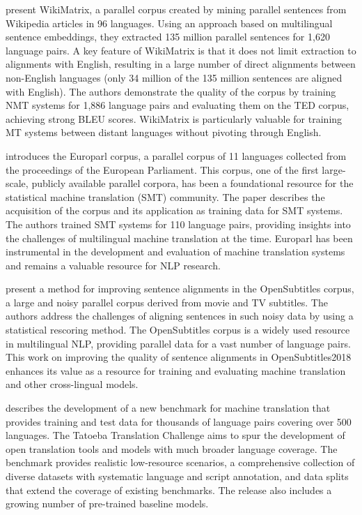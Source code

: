 \documentclass[acmsmall]{acmart}
\begin{document}
   \citep{schwenk-etal-2021-wikimatrix} present WikiMatrix, a parallel corpus created by mining parallel sentences from Wikipedia articles in 96 languages. Using an approach based on multilingual sentence embeddings, they extracted 135 million parallel sentences for 1,620 language pairs. A key feature of WikiMatrix is that it does not limit extraction to alignments with English, resulting in a large number of direct alignments between non-English languages (only 34 million of the 135 million sentences are aligned with English). The authors demonstrate the quality of the corpus by training NMT systems for 1,886 language pairs and evaluating them on the TED corpus, achieving strong BLEU scores. WikiMatrix is particularly valuable for training MT systems between distant languages without pivoting through English.



   \citep{koehn-2005-europarl} introduces the Europarl corpus, a parallel corpus of 11 languages collected from the proceedings of the European Parliament. This corpus, one of the first large-scale, publicly available parallel corpora, has been a foundational resource for the statistical machine translation (SMT) community. The paper describes the acquisition of the corpus and its application as training data for SMT systems. The authors trained SMT systems for 110 language pairs, providing insights into the challenges of multilingual machine translation at the time. Europarl has been instrumental in the development and evaluation of machine translation systems and remains a valuable resource for NLP research.

\citep{lison-etal-2018-opensubtitles2018} present a method for improving sentence alignments in the OpenSubtitles corpus, a large and noisy parallel corpus derived from movie and TV subtitles. The authors address the challenges of aligning sentences in such noisy data by using a statistical rescoring method. The OpenSubtitles corpus is a widely used resource in multilingual NLP, providing parallel data for a vast number of language pairs. This work on improving the quality of sentence alignments in OpenSubtitles2018 enhances its value as a resource for training and evaluating machine translation and other cross-lingual models.

\citep{tiedemann-2020-tatoeba} describes the development of a new benchmark for machine translation that provides training and test data for thousands of language pairs covering over 500 languages. The Tatoeba Translation Challenge aims to spur the development of open translation tools and models with much broader language coverage. The benchmark provides realistic low-resource scenarios, a comprehensive collection of diverse datasets with systematic language and script annotation, and data splits that extend the coverage of existing benchmarks. The release also includes a growing number of pre-trained baseline models.
\end{document}
